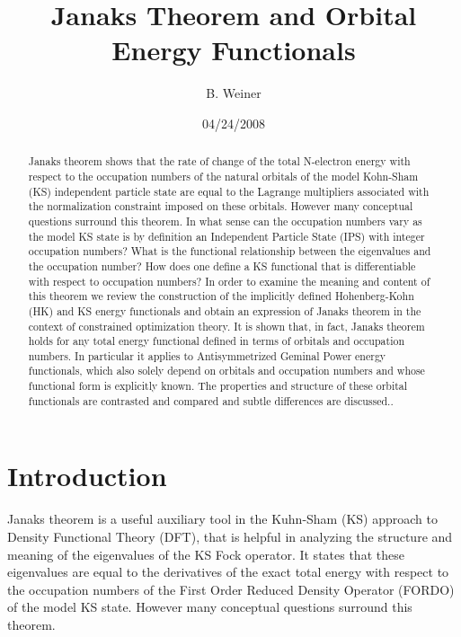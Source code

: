\documentclass[aps,preprint]{revtex4}%
\begin{document}
\preprint{ }
\title[Janaks Theorem]{Janaks Theorem and Orbital Energy Functionals }
\author{B. Weiner}
\keywords{}
\pacs{}

\begin{abstract}
Janaks theorem shows that the rate of change of the total N-electron energy
with respect to the occupation numbers of the natural orbitals of the model
Kohn-Sham (KS) independent particle state are equal to the Lagrange
multipliers associated with the normalization constraint imposed on these
orbitals. However many conceptual questions surround this theorem. In what
sense can the occupation numbers vary as the model KS state is by definition
an Independent Particle State (IPS) with integer occupation numbers? What is
the functional relationship between the eigenvalues and the occupation number?
How does one define a KS functional that is differentiable with respect to
occupation numbers? In order to examine the meaning and content of this
theorem we review the construction of the implicitly defined Hohenberg-Kohn
(HK) and KS energy functionals and obtain an expression of Janaks theorem in
the context of constrained optimization theory. It is shown that, in fact,
Janaks theorem holds for any total energy functional defined in terms of
orbitals and occupation numbers. In particular it applies to Antisymmetrized
Geminal Power energy functionals, which also solely depend on orbitals and
occupation numbers and whose functional form is explicitly known. The
properties and structure of these orbital functionals are contrasted and
compared and subtle differences are discussed..\qquad

\end{abstract}
\date{04/24/2008}
\maketitle
\tableofcontents


\section{Introduction\label{Intro}}

Janaks theorem \cite{Janak1978} is a useful auxiliary tool in the Kuhn-Sham
(KS) \cite{KS1965} approach to Density Functional Theory (DFT), that is
helpful in analyzing the structure and meaning of the eigenvalues of the KS
Fock operator. It states that these eigenvalues are equal to the derivatives
of the exact total energy with respect to the occupation numbers of the First
Order Reduced Density Operator (FORDO) of the model KS state. However many
conceptual questions surround this theorem.
\end{document}
